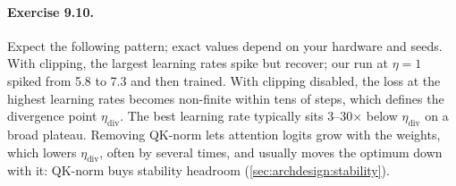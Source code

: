 \paragraph{Exercise 9.10.} Expect the following pattern; exact values depend on your hardware
and seeds. With clipping, the largest learning rates spike but recover; our run at $\eta=1$
spiked from 5.8 to 7.3 and then trained. With clipping disabled, the loss at the highest
learning rates becomes non-finite within tens of steps, which defines the divergence point
$\eta_{\text{div}}$. The best learning rate typically sits 3--30$\times$ below $\eta_{\text{div}}$
on a broad plateau. Removing QK-norm lets attention logits grow with the weights, which lowers
$\eta_{\text{div}}$, often by several times, and usually moves the optimum down with it: QK-norm
buys stability headroom (\cref{sec:archdesign:stability}).
